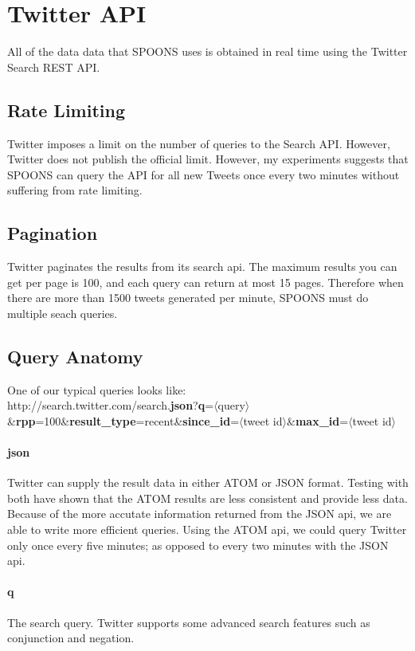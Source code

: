 \documentclass[12pt]{ucthesis}
\begin{document}
\section{Twitter API}
\label{background-twitter-api}
All of the data data that SPOONS uses is obtained in real time using the Twitter Search REST API\cite{TwitterAPI}.

\subsection{Rate Limiting}
\label{api-rate-limit}
Twitter imposes a limit on the number of queries to the Search API. However, Twitter does not publish the official
limit. However, my experiments suggests that SPOONS can query the API for all new Tweets once every two minutes without
suffering from rate limiting.

\subsection{Pagination}
\label{api-pagination}
Twitter paginates the results from its search api. The maximum results you can get per page is 100, and each
query can return at most 15 pages. Therefore when there are more than 1500 tweets generated per minute,
SPOONS must do multiple seach queries.

\subsection{Query Anatomy}
\label{api-anatomy}
One of our typical queries looks like:\\
http://search.twitter.com/search.\textbf{json}?\textbf{q}=$\langle$query$\rangle$\&\textbf{rpp}=100\&\textbf{result\_type}=recent\&\textbf{since\_id}=$\langle$tweet id$\rangle$\&\textbf{max\_id}=$\langle$tweet id$\rangle$

\paragraph{json}
Twitter can supply the result data in either ATOM or JSON format. Testing with both have shown that the ATOM
results are less consistent and provide less data. Because of the more accutate information returned from the JSON
api, we are able to write more efficient queries. Using the ATOM api, we could query Twitter only once every five
minutes; as opposed to every two minutes with the JSON api.

\paragraph{q}
The search query. Twitter supports some advanced search features such as conjunction and negation.
\end{document}
